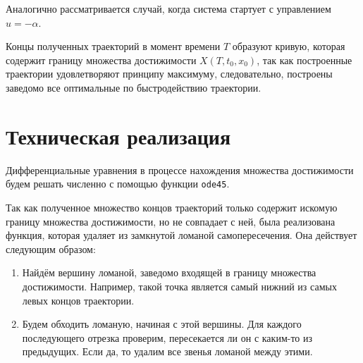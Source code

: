 \documentclass[11pt]{article}
\begin{document}
Аналогично рассматривается случай, когда система стартует с управлением $u = -\alpha$.

Концы полученных траекторий в момент времени $T$ образуют кривую, которая содержит границу множества достижимости $X(T, t_0, x_0)$, так как построенные траектории удовлетворяют принципу максимуму, следовательно, построены заведомо все оптимальные по быстродействию траектории.
\section{Техническая реализация}

Дифференциальные уравнения в процессе нахождения множества достижимости будем решать численно с помощью функции \texttt{ode45}.

Так как полученное множество концов траекторий только содержит искомую границу множества достижимости, но не совпадает с ней, была реализована функция, которая удаляет из замкнутой ломаной самопересечения. Она действует следующим образом:
\begin{enumerate}
\item
Найдём вершину ломаной, заведомо входящей в границу множества достижимости. Например, такой точка является самый нижний из самых левых концов траектории.
\item
Будем обходить ломаную, начиная с этой вершины. Для каждого последующего отрезка проверим, пересекается ли он с каким-то из предыдущих. Если да, то удалим все звенья ломаной между этими.
\end{enumerate}
\end{document}
